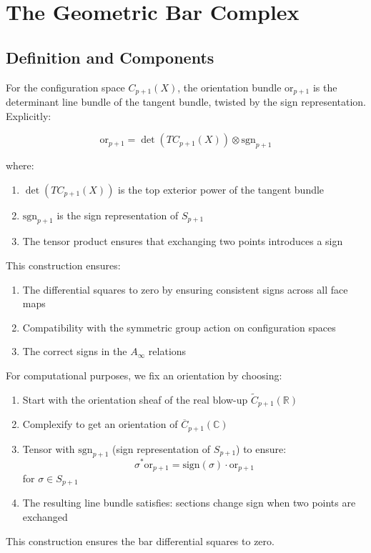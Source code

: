 \section{The Geometric Bar Complex}
 
\subsection{Definition and Components}

\begin{definition}
For the configuration space $C_{p+1}(X)$, the orientation bundle $\text{or}_{p+1}$ is the determinant line bundle of the tangent bundle, twisted by the sign representation. Explicitly:

$$\text{or}_{p+1} = \det(TC_{p+1}(X)) \otimes \text{sgn}_{p+1}$$

where:
\begin{enumerate}
\item $\det(TC_{p+1}(X))$ is the top exterior power of the tangent bundle
\item $\text{sgn}_{p+1}$ is the sign representation of $S_{p+1}$
\item The tensor product ensures that exchanging two points introduces a sign
\end{enumerate}

This construction ensures:
\begin{enumerate}
\item The differential squares to zero by ensuring consistent signs across all face maps
\item Compatibility with the symmetric group action on configuration spaces
\item The correct signs in the $A_\infty$ relations
\end{enumerate}
\end{definition}

\begin{remark}
For computational purposes, we fix an orientation by choosing:
\begin{enumerate}
\item Start with the orientation sheaf of the real blow-up $\widetilde{C}_{p+1}(\mathbb{R})$
\item Complexify to get an orientation of $\overline{C}_{p+1}(\mathbb{C})$ 
\item Tensor with $\text{sgn}_{p+1}$ (sign representation of $S_{p+1}$) to ensure:
   $$\sigma^* \text{or}_{p+1} = \text{sign}(\sigma) \cdot \text{or}_{p+1}$$
   for $\sigma \in S_{p+1}$
\item The resulting line bundle satisfies: sections change sign when two points are exchanged
\end{enumerate}
This construction ensures the bar differential squares to zero.
\end{remark}

